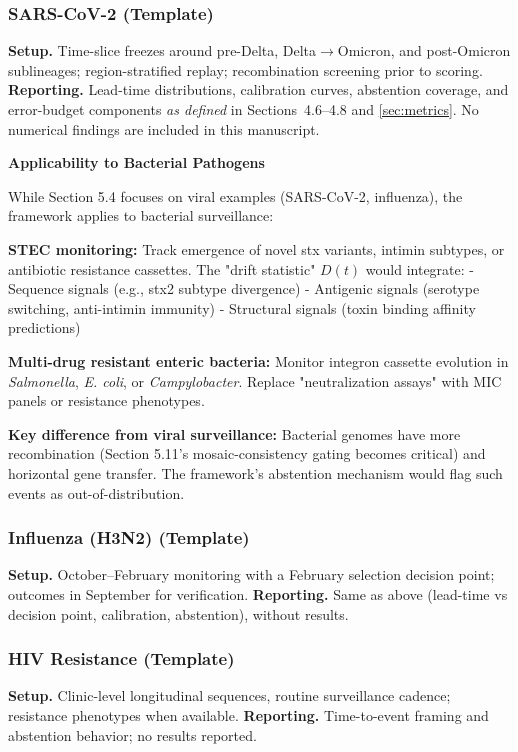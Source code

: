 \documentclass[11pt]{article}
\begin{document}
\subsubsection{SARS-CoV-2 (Template)}
\label{sec:covid}
\textbf{Setup.} Time-slice freezes around pre-Delta, Delta$\to$Omicron, and post-Omicron sublineages; region-stratified replay; recombination screening prior to scoring.  
\textbf{Reporting.} Lead-time distributions, calibration curves, abstention coverage, and error-budget components \emph{as defined} in Sections~4.6--4.8 and \ref{sec:metrics}. No numerical findings are included in this manuscript.

\begin{mdframed}[backgroundcolor=purple!5]
\textbf{Applicability to Bacterial Pathogens}

While Section 5.4 focuses on viral examples (SARS-CoV-2, influenza), the framework applies to bacterial surveillance:

\textbf{STEC monitoring:} Track emergence of novel stx variants, intimin subtypes, or antibiotic resistance cassettes. The "drift statistic" $D(t)$ would integrate:
- Sequence signals (e.g., stx2 subtype divergence)
- Antigenic signals (serotype switching, anti-intimin immunity)
- Structural signals (toxin binding affinity predictions)

\textbf{Multi-drug resistant enteric bacteria:} Monitor integron cassette evolution in \emph{Salmonella}, \emph{E. coli}, or \emph{Campylobacter}. Replace "neutralization assays" with MIC panels or resistance phenotypes.

\textbf{Key difference from viral surveillance:} Bacterial genomes have more recombination (Section 5.11's mosaic-consistency gating becomes critical) and horizontal gene transfer. The framework's abstention mechanism would flag such events as out-of-distribution.
\end{mdframed}
\subsubsection{Influenza (H3N2) (Template)}
\label{sec:flu}
\textbf{Setup.} October--February monitoring with a February selection decision point; outcomes in September for verification.  
\textbf{Reporting.} Same as above (lead-time vs decision point, calibration, abstention), without results.

\subsubsection{HIV Resistance (Template)}
\label{sec:hiv}
\textbf{Setup.} Clinic-level longitudinal sequences, routine surveillance cadence; resistance phenotypes when available.  
\textbf{Reporting.} Time-to-event framing and abstention behavior; no results reported.
\end{document}
